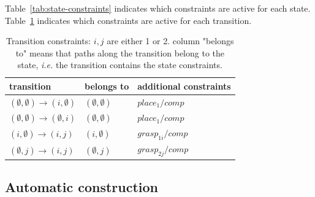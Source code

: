 Table~\ref{tab:state-constraints} indicates which constraints are active for each state. Table~\ref{tab:transition-constraints} indicates which constraints are active for each transition.

\begin{table}
  \begin{center}
    \begin{tabular}{|p{.23\linewidth}|p{.18\linewidth}|p{.43\linewidth}|}
      \hline
      transition & belongs to & additional constraints\\
      \hline
      $(\emptyset,\emptyset)\rightarrow (i,\emptyset)$ & $(\emptyset,\emptyset)$ & $place_1/comp$\\
      $(\emptyset,\emptyset)\rightarrow (\emptyset,i)$ & $(\emptyset,\emptyset)$ & $place_1/comp$\\
      $(i,\emptyset)\rightarrow(i,j)$ & $(i,\emptyset)$ & $grasp_{1i}/comp$\\
      $(\emptyset,j)\rightarrow(i,j)$ & $(\emptyset,j)$ & $grasp_{2j}/comp$\\
      \hline
    \end{tabular}
  \end{center}
  \caption{Transition constraints: $i,j$ are either 1 or 2. column
    "belongs to" means that paths along the transition belong to the
    state, \textit{i.e.} the transition contains the state
    constraints.}
  \label{tab:transition-constraints}
\end{table}

\subsection{Automatic construction}

